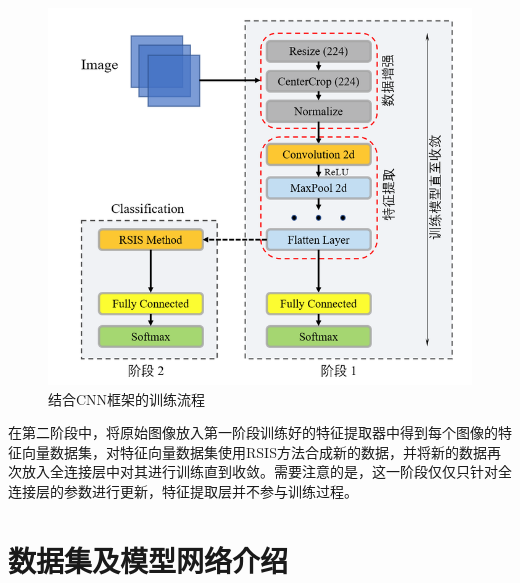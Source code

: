 \documentclass{NauThesis}
\begin{document}
\begin{figure}[htbp]
    \centering
    \includegraphics[width=1.0\textwidth]{figs/fig7.png}
    \caption{结合CNN框架的训练流程}
    \label{fig7}
\end{figure}


\newpage
在第二阶段中，将原始图像放入第一阶段训练好的特征提取器中得到每个图像的特征向量数据集，对特征向量数据集使用RSIS方法合成新的数据，并将新的数据再次放入全连接层中对其进行训练直到收敛。需要注意的是，这一阶段仅仅只针对全连接层的参数进行更新，特征提取层并不参与训练过程。

\section{数据集及模型网络介绍}
\end{document}
